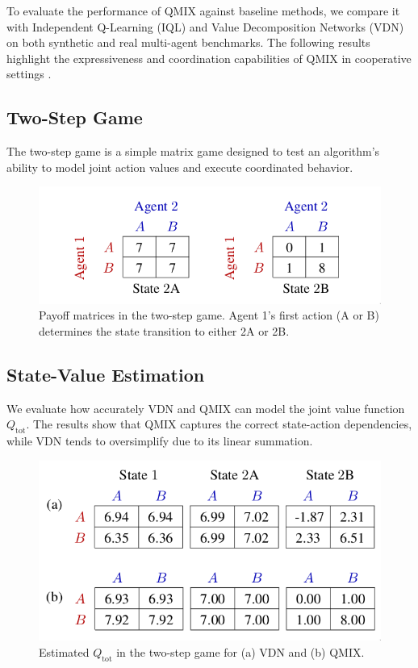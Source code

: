 \documentclass[../Main.tex]{subfiles}
\begin{document}
To evaluate the performance of QMIX against baseline methods, we compare it with Independent Q-Learning (IQL) and Value Decomposition Networks (VDN) on both synthetic and real multi-agent benchmarks. The following results highlight the expressiveness and coordination capabilities of QMIX in cooperative settings \cite{rashid2018qmix}.

\subsection{Two-Step Game}

The two-step game is a simple matrix game designed to test an algorithm’s ability to model joint action values and execute coordinated behavior.

\begin{figure}[h]
    \centering
    \includegraphics[width=0.8\linewidth]{img/2step-game.png}
    \caption{Payoff matrices in the two-step game. Agent 1’s first action (A or B) determines the state transition to either 2A or 2B.}
    \label{fig:2step-matrix}
\end{figure}

\subsection{State-Value Estimation}

We evaluate how accurately VDN and QMIX can model the joint value function \( Q_{\text{tot}} \). The results show that QMIX captures the correct state-action dependencies, while VDN tends to oversimplify due to its linear summation.

\begin{figure}[h]
    \centering
    \includegraphics[width=0.8\linewidth]{img/results/2step-game-results.png}
    \caption{Estimated \( Q_{\text{tot}} \) in the two-step game for (a) VDN and (b) QMIX.}
    \label{fig:2step-results}
\end{figure}
\end{document}

